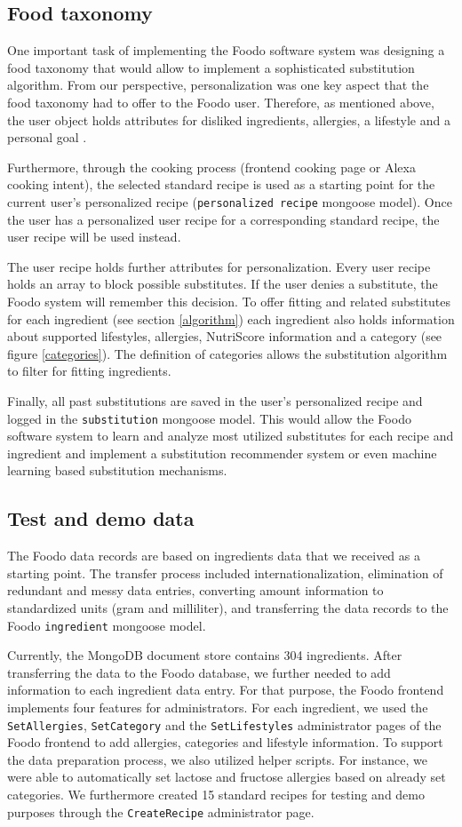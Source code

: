 \subsection*{Food taxonomy}
One important task of implementing the Foodo software system was designing a food taxonomy that would allow to implement a sophisticated substitution algorithm. From our perspective, personalization was one key aspect that the food taxonomy had to offer to the Foodo user. Therefore, as mentioned above, the user object holds attributes for disliked ingredients, allergies, a lifestyle and a personal goal . 

Furthermore, through the cooking process (frontend cooking page or Alexa cooking intent), the selected standard recipe is used as a starting point for the current user's personalized recipe (\texttt{personalized recipe} mongoose model). Once the user has a personalized user recipe for a corresponding standard recipe, the user recipe will be used instead. 

The user recipe holds further attributes for personalization. Every user recipe holds an array to block possible substitutes. If the user denies a substitute, the Foodo system will remember this decision. To offer fitting and related substitutes for each ingredient (see section \ref{algorithm}) each ingredient also holds information about supported lifestyles, allergies, NutriScore information and a category (see figure \ref{categories}). The definition of categories allows the substitution algorithm to filter for fitting ingredients. 

Finally, all past substitutions are saved in the user's personalized recipe and logged in the \texttt{substitution} mongoose model. This would allow the Foodo software system to learn and analyze most utilized substitutes for each recipe and ingredient and implement a substitution recommender system or even machine learning based substitution mechanisms. 

\subsection*{Test and demo data}
The Foodo data records are based on ingredients data that we received as a starting point. The transfer process included internationalization, elimination of redundant and messy data entries, converting amount information to standardized units (gram and milliliter), and transferring the data records to the Foodo \texttt{ingredient} mongoose model. 

Currently, the MongoDB document store contains 304 ingredients. After transferring the data to the Foodo database, we further needed to add information to each ingredient data entry. For that purpose, the Foodo frontend implements four features for administrators. For each ingredient, we used the \texttt{SetAllergies}, \texttt{SetCategory} and the \texttt{SetLifestyles} administrator pages of the Foodo frontend to add allergies, categories and lifestyle information. To support the data preparation process, we also utilized helper scripts. For instance, we were able to automatically set lactose and fructose allergies based on already set categories. We furthermore created 15 standard recipes for testing and demo purposes through the \texttt{CreateRecipe} administrator page.